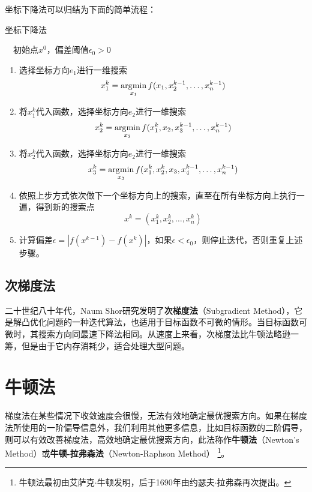 坐标下降法可以归结为下面的简单流程：
\begin{algorithm}[htbp]
        \caption{坐标下降法}
        \begin{algorithmic}
            \REQUIRE ~~初始点$x^0$，偏差阈值$\epsilon_0>0$\\
            \STATE
            \begin{enumerate}
                \item 选择坐标方向$e_1$进行一维搜索
                \[
                    x_1^k = \operatorname*{\mathrm{\arg\!\min}}\limits_{x_1} f(x_1,x_2^{k-1},\ldots,x_n^{k-1})
                \]
                \item 将$x_1^k$代入函数，选择坐标方向$e_2$进行一维搜索
                \[
                    x_2^k = \operatorname*{\mathrm{\arg\!\min}}\limits_{x_2} f(x_1^k,x_2,x_3^{k-1},\ldots,x_n^{k-1})
                \]
                \item 将$x_2^k$代入函数，选择坐标方向$e_2$进行一维搜索
                \[
                    x_3^k = \operatorname*{\mathrm{\arg\!\min}}\limits_{x_3} f(x_1^k,x_2^k,x_3,x_4^{k-1},\ldots,x_n^{k-1})
                \]
                \item 依照上步方式依次做下一个坐标方向上的搜索，直至在所有坐标方向上执行一遍，得到新的搜索点
                \[
                    x^k = (x_1^k,x_2^k,\ldots,x_n^k)
                \]
                \item 计算偏差$\epsilon=|f(x^{k-1}) - f(x^k)|$，如果$\epsilon<\epsilon_0$，则停止迭代，否则重复上述步骤。
            \end{enumerate}
            \ENDFOR
        \end{algorithmic}
\end{algorithm}

\subsection{次梯度法}
二十世纪八十年代，Naum Shor\cite{shor1985minimization,shor2012minimization}研究发明了\textbf{次梯度法}（Subgradient Method），它是解凸优化问题的一种迭代算法，也适用于目标函数不可微的情形。当目标函数可微时，其搜索方向同最速下降法相同。从速度上来看，次梯度法比牛顿法略逊一筹，但是由于它内存消耗少，适合处理大型问题。

\section{牛顿法}
梯度法在某些情况下收敛速度会很慢，无法有效地确定最优搜索方向。如果在梯度法所使用的一阶偏导信息外，我们利用其他更多信息，比如目标函数的二阶偏导，则可以有效改善梯度法，高效地确定最优搜索方向，此法称作\textbf{牛顿法}（Newton's Method）或\textbf{牛顿-拉弗森法}（Newton-Raphson Method）
\footnote{牛顿法最初由艾萨克$\cdot$牛顿发明，后于1690年由约瑟夫$\cdot$拉弗森再次提出。}。

